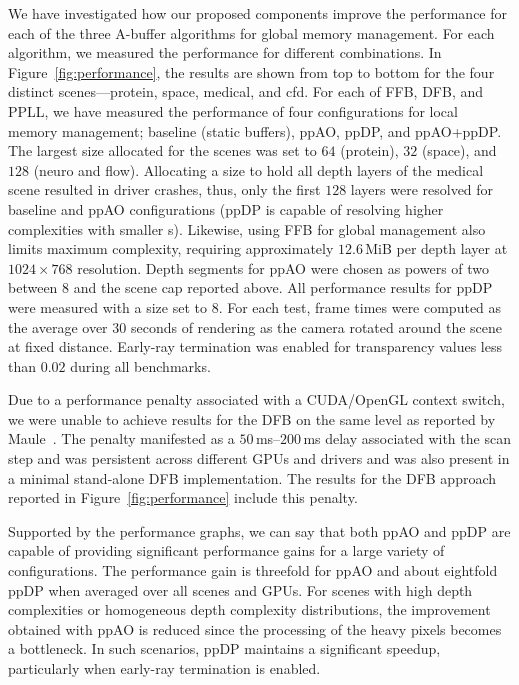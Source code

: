 \documentclass{egpubl}
\newcommand{\yellow}[1]{{\color{Goldenrod}#1}}
\newcommand{\minor}[1]{\yellow{#1}}
\newcommand{\ab}{\mbox{A-buffer}}
\newcommand{\stencil}{ppAO}
\newcommand{\dloop}{ppDP}
\begin{document}
We have investigated how our proposed components improve the performance for each of the three \ab{} algorithms for global memory management. %
For each algorithm, we measured the performance for different combinations.
In Figure~\ref{fig:performance}, the results are shown from top to bottom for the four distinct scenes---protein, space, medical, and cfd.
For each of FFB, DFB, and PPLL, we have measured the performance of four configurations for local memory management; baseline (static buffers), \stencil{}, \dloop{}, and \stencil{}+\dloop{}. 
The largest \bArray{} size allocated for the scenes was set to $64$ (protein), $32$ (space), and $128$ (neuro and flow). 
Allocating a \bArray{} size to hold all depth layers of the medical scene resulted in driver crashes, thus, only the first $128$ layers were resolved for baseline and \stencil{} configurations (\dloop{} is capable of resolving higher complexities with smaller \bArray{}s). 
Likewise, using FFB for global management also limits maximum complexity, requiring approximately $12.6$\,MiB per depth layer at $1024 \times 768$ resolution. 
Depth segments for \stencil{} were chosen as powers of two between $8$ and the scene cap reported above. 
All performance results for \dloop{} were measured with a \bArray{} size set to $8$. 
For each test, frame times were computed as the average over $30$ seconds of rendering as the camera rotated around the scene at fixed distance. 
Early-ray termination was enabled for transparency values less than $0.02$ during all benchmarks.

Due to a performance penalty \minor{associated with a CUDA/OpenGL context switch}, we were unable to achieve results for the DFB on the same level as reported by Maule~\cite{Maule2012}. 
The penalty manifested as a $50\,$ms--$200\,$ms delay associated with the scan step and was persistent across different GPUs and drivers and was also present in a minimal stand-alone DFB implementation.
The results for the DFB approach reported in Figure~\ref{fig:performance} include this penalty.

Supported by the performance graphs, we can say that both \stencil{} and \dloop{} are capable of providing significant performance gains for a large variety of configurations. 
The performance gain is threefold for \stencil{} and about eightfold \dloop{} when averaged over all scenes and GPUs. %
For scenes with high depth complexities or homogeneous depth complexity distributions, the improvement obtained with \stencil{} is reduced since the processing of the heavy pixels becomes a bottleneck. 
In such scenarios, \dloop{} maintains a significant speedup, particularly when early-ray termination is enabled. 
\end{document}
